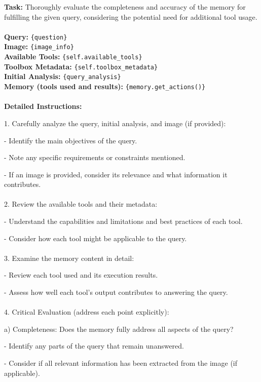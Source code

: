 \begin{textcolorbox}
\textbf{Task:} Thoroughly evaluate the completeness and accuracy of the memory for fulfilling the given query, considering the potential need for additional tool usage.
\\\\
\textbf{Query:} \texttt{\{question\}}
\\
\textbf{Image:} \texttt{\{image\_info\}}
\\
\textbf{Available Tools:} \texttt{\{self.available\_tools\}}
\\
\textbf{Toolbox Metadata:} \texttt{\{self.toolbox\_metadata\}}
\\
\textbf{Initial Analysis:} \texttt{\{query\_analysis\}}
\\
\textbf{Memory (tools used and results):} \texttt{\{memory.get\_actions()\}}
\\\\
\textbf{Detailed Instructions:}

1. Carefully analyze the query, initial analysis, and image (if provided):

\quad - Identify the main objectives of the query.

\quad - Note any specific requirements or constraints mentioned.

\quad - If an image is provided, consider its relevance and what information it contributes.
\\\\
2. Review the available tools and their metadata:

\quad - Understand the capabilities and limitations and best practices of each tool.

\quad - Consider how each tool might be applicable to the query.
\\\\
3. Examine the memory content in detail:

\quad - Review each tool used and its execution results.

\quad - Assess how well each tool's output contributes to answering the query.
\\\\
4. Critical Evaluation (address each point explicitly):

\quad a) Completeness: Does the memory fully address all aspects of the query?

\quad\quad - Identify any parts of the query that remain unanswered.

\quad\quad - Consider if all relevant information has been extracted from the image (if applicable).


\end{textcolorbox}
